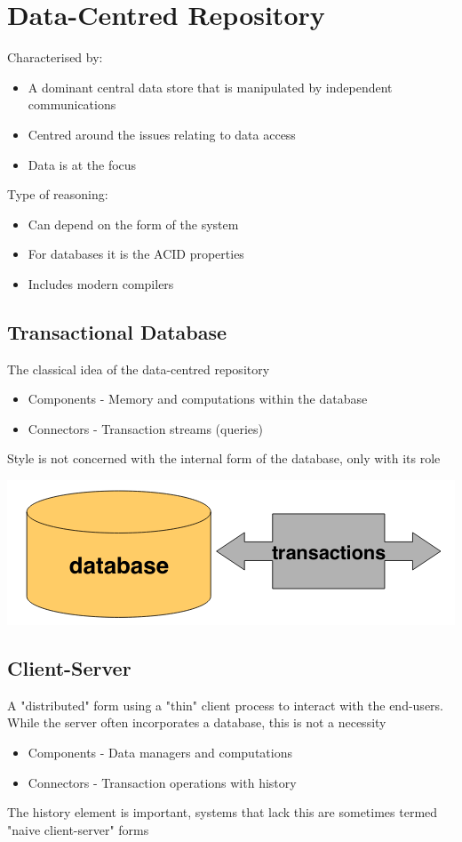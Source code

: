 \documentclass{article}[18pt]
\begin{document}
\section{Data-Centred Repository}
Characterised by:
\begin{itemize}
	\item A dominant central data store that is manipulated by independent communications
	\item Centred around the issues relating to data access 
	\item Data is at the focus
\end{itemize}
Type of reasoning:
\begin{itemize}
	\item Can depend on the form of the system
	\item For databases it is the ACID properties
	\item Includes modern compilers
\end{itemize}
\subsection{Transactional Database}
The classical idea of the data-centred repository
\begin{itemize}
	\item Components - Memory and computations within the database
	\item Connectors - Transaction streams (queries)
\end{itemize}
Style is not concerned with the internal form of the database, only with its role
\begin{center}
	\includegraphics[scale=0.7]{"Transactional Database"}
\end{center}
\subsection{Client-Server}
A "distributed" form using a "thin" client process to interact with the end-users. While the server often incorporates a database, this is not a necessity
\begin{itemize}
	\item Components - Data managers and computations
	\item Connectors - Transaction operations with history
\end{itemize}
The history element is important, systems that lack this are sometimes termed "naive client-server" forms
\end{document}
